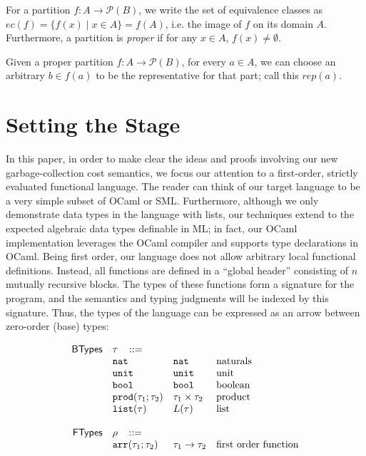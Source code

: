 \documentclass{easychair}
\newcommand{\ms}[1]{\ensuremath{\mathsf{#1}}}
\newcommand{\irl}[1]{\mathtt{#1}}
\theoremstyle{definition}
\begin{document}
For a partition $f : A \to \mathcal{P}(B)$, we write the set of equivalence classes
as $ec(f) = \{f(x) \mid x \in A\} = f(A)$, i.e. the image of $f$ on its domain $A$.
Furthermore, a partition is \emph{proper} if for any $x \in A$, $f(x) \neq \emptyset$.

Given a proper partition $f : A \to \mathcal{P}(B)$, for every $a \in A$, 
we can choose an arbitrary 
$b \in f(a)$ to be the representative for that part; call this $rep(a)$.
\fi

\section{Setting the Stage}
\label{sect:fop}

In this paper, in order to make clear the ideas and proofs involving our new garbage-collection 
cost semantics, we focus our attention to a first-order, 
strictly evaluated functional language. 
The reader can think of our target language to be a very simple subset of OCaml or SML. 
Furthermore, although we only demonstrate data types in the language with lists, 
our techniques extend to the expected algebraic data types definable in ML; in fact, 
our OCaml implementation leverages the OCaml compiler and supports type declarations in OCaml. 
Being first order, our language does not allow arbitrary local functional definitions. Instead,
all functions are defined in a ``global header'' consisting of $n$ mutually recursive blocks. 
The types of these functions form a signature for the program, and the semantics and typing 
judgments will be indexed by this signature. Thus, the types of the language can be expressed 
as an arrow between zero-order (base)  types: 

\[
\begin{array}{r l l l l}
\ms{BTypes} & \tau \,\,\,\,\, ::= \\
	& \irl{nat}                	 			& \irl{nat}											& \text{naturals}\\
	& \unittyabt                	 			& \unittycst										& \text{unit}\\
  & \booltyabt                       & \booltycst                    & \text{boolean}\\
  & \prodtyabt{\tau_1}{\tau_2}       & \prodtycst{\tau_1}{\tau_2}    & \text{product}\\
  &\listtyabt{\tau}		& L(\tau)											& \text{list}\\
  \\
\ms{FTypes} & \rho \,\,\,\,\, ::= \\
	&\irl{arr}(\tau_1;\tau_2) 				& \arrtycst{\tau_1}{\tau_2} 									& \text{first order function}
\end{array}
\]
\end{document}
